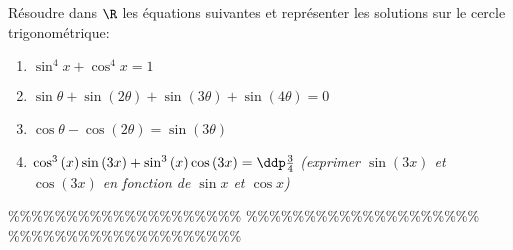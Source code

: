 



\begin{exercice}  \;
R\'esoudre dans $\R$ les \'equations suivantes et repr\'esenter les solutions sur le cercle trigonom\'etrique:
\begin{enumerate}
\item
$\sin^4{x}+\cos^4{x}=1$
\item
$\sin{\theta}+\sin{(2\theta)}+\sin{(3\theta)}+\sin{(4\theta)}=0$
\item
$\cos{\theta}-\cos{(2\theta)}=\sin{(3\theta)}$
\item
$\cos^3{(x)}\sin{(3x)} + \sin^3{(x)}\cos{(3x)}=\ddp\frac{3}{4}$ \; \textit{(exprimer $\sin{(3x)}$ et $\cos{(3x)}$ 
en fonction de $\sin{x}$ et $\cos{x}$)}
\end{enumerate}
\end{exercice}


\%\%\%\%\%\%\%\%\%\%\%\%\%\%\%\%\%\%\%\%
\%\%\%\%\%\%\%\%\%\%\%\%\%\%\%\%\%\%\%\%
\%\%\%\%\%\%\%\%\%\%\%\%\%\%\%\%\%\%\%\%




